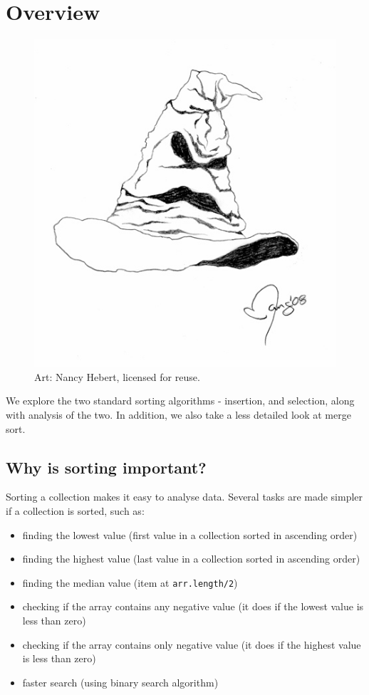 \def\topic{Sorting}


\section{Overview}

\begin{figure}
\centering	
\includegraphics[width=.4\textwidth]{images/sortingHat.jpg}
\caption{Art: Nancy Hebert, licensed for reuse.}
\end{figure}

  We explore the two standard sorting algorithms - insertion, and selection, along with analysis of the two. In addition, we also take a less detailed look at merge sort.
 
\subsection{Why is sorting important?}

Sorting a collection makes it easy to analyse data. Several tasks are made simpler if a collection is sorted, such as:

\begin{itemize}
\item finding the lowest value (first value in a collection sorted in ascending order)
\item finding the highest value (last value in a collection sorted in ascending order)
\item finding the median value (item at \texttt{arr.length/2})
\item checking if the array contains any negative value (it does if the lowest value is less than zero)	
\item checking if the array contains only negative value (it does if the highest value is less than zero)
\item faster search (using binary search algorithm)	
\end{itemize}

